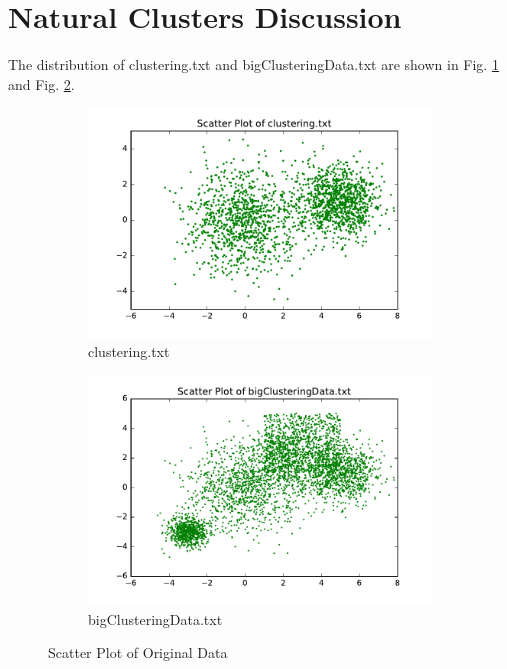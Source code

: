 \section{\Large Natural Clusters Discussion}

The distribution of clustering.txt and bigClusteringData.txt are shown in Fig. \ref{fig:16a} and Fig. \ref{fig:16b}.
\begin{figure}[H]
\centering
\centering
        \begin{subfigure}[b]{0.49\textwidth}
            \centering
            \includegraphics[width=\textwidth]{./figures/clustering_scatter.pdf}
            \caption{clustering.txt}\label{fig:16a}
        \end{subfigure}
        \hfill
        \begin{subfigure}[b]{0.49\textwidth}  
            \centering 
            \includegraphics[width=\textwidth]{./figures/bigClustering_scatter.pdf}
            \caption{bigClusteringData.txt}\label{fig:16b}
        \end{subfigure}
\caption{Scatter Plot of Original Data}
\label{fig:clusters} 
\end{figure}


